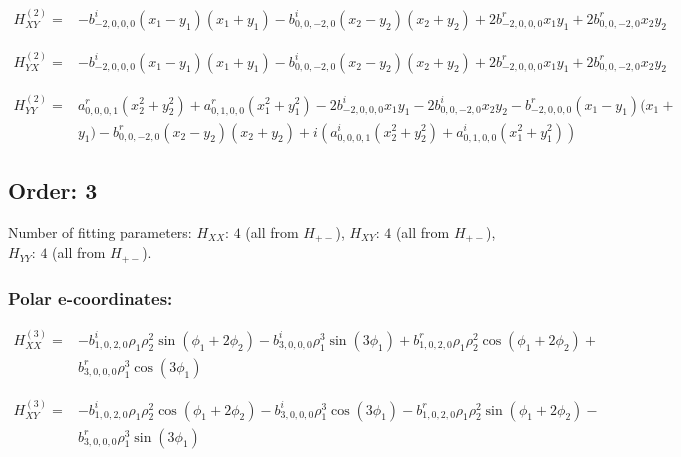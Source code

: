 \documentclass[fleqn]{article}
\begin{document}
\begin{align*}
H_{XY}^{(2)}=&-  b^{i}_{-2,0,0,0} (x_{1} - y_{1}) (x_{1} + y_{1}) -  b^{i}_{0,0,-2,0} (x_{2} - y_{2}) (x_{2} + y_{2}) + 2 b^{r}_{-2,0,0,0} x_{1} y_{1} + 2 b^{r}_{0,0,-2,0} x_{2} y_{2}
\end{align*}

\begin{align*}
H_{YX}^{(2)}=&-  b^{i}_{-2,0,0,0} (x_{1} - y_{1}) (x_{1} + y_{1}) -  b^{i}_{0,0,-2,0} (x_{2} - y_{2}) (x_{2} + y_{2}) + 2 b^{r}_{-2,0,0,0} x_{1} y_{1} + 2 b^{r}_{0,0,-2,0} x_{2} y_{2}
\end{align*}

\begin{align*}
H_{YY}^{(2)}=& a^{r}_{0,0,0,1} (x_{2}^{2} + y_{2}^{2}) +  a^{r}_{0,1,0,0} (x_{1}^{2} + y_{1}^{2}) - 2 b^{i}_{-2,0,0,0} x_{1} y_{1} - 2 b^{i}_{0,0,-2,0} x_{2} y_{2} -  b^{r}_{-2,0,0,0} (x_{1} - y_{1}) (x_{1} +\\
& y_{1}) -  b^{r}_{0,0,-2,0} (x_{2} - y_{2}) (x_{2} + y_{2}) +  i ( a^{i}_{0,0,0,1} (x_{2}^{2} + y_{2}^{2}) +  a^{i}_{0,1,0,0} (x_{1}^{2} + y_{1}^{2}))
\end{align*}
\subsection{Order: 3}
Number of fitting parameters: $H_{XX}$: $4$ (all from $H_{+-}$), $H_{XY}$: $4$ (all from $H_{+-}$), $H_{YY}$: $4$ (all from $H_{+-}$).
\subsubsection*{Polar e-coordinates:}

\begin{align*}
H_{XX}^{(3)}=&- b^{i}_{1,0,2,0} \rho_{1} \rho_{2}^{2} \sin (\phi_{1} + 2 \phi_{2}) - b^{i}_{3,0,0,0} \rho_{1}^{3} \sin (3 \phi_{1}) + b^{r}_{1,0,2,0} \rho_{1} \rho_{2}^{2} \cos (\phi_{1} + 2 \phi_{2}) +\\
& b^{r}_{3,0,0,0} \rho_{1}^{3} \cos (3 \phi_{1})
\end{align*}

\begin{align*}
H_{XY}^{(3)}=&-  b^{i}_{1,0,2,0} \rho_{1} \rho_{2}^{2} \cos (\phi_{1} + 2 \phi_{2}) -  b^{i}_{3,0,0,0} \rho_{1}^{3} \cos (3 \phi_{1}) -  b^{r}_{1,0,2,0} \rho_{1} \rho_{2}^{2} \sin (\phi_{1} + 2 \phi_{2}) -\\
&  b^{r}_{3,0,0,0} \rho_{1}^{3} \sin (3 \phi_{1})
\end{align*}
\end{document}

